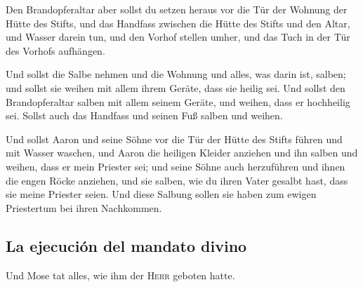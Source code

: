  Den Brandopferaltar aber sollst du setzen heraus vor die
Tür der Wohnung der Hütte des Stifts,  und das Handfass
zwischen die Hütte des Stifts und den Altar, und Wasser darein tun,
 und den Vorhof stellen umher, und das Tuch in der Tür des
Vorhofs aufhängen.

 Und sollst die Salbe nehmen und die Wohnung und alles,
was darin ist, salben; und sollst sie weihen mit allem ihrem Geräte,
dass sie heilig sei.  Und sollst den Brandopferaltar
salben mit allem seinem Geräte, und weihen, dass er hochheilig sei.
 Sollst auch das Handfass und seinen Fuß salben und
weihen.

 Und sollst Aaron und seine Söhne vor die Tür der Hütte
des Stifts führen und mit Wasser waschen,  und Aaron die
heiligen Kleider anziehen und ihn salben und weihen, dass er mein
Priester sei;  und seine Söhne auch herzuführen und ihnen
die engen Röcke anziehen,  und sie salben, wie du ihren
Vater gesalbt hast, dass sie meine Priester seien. Und diese Salbung
sollen sie haben zum ewigen Priestertum bei ihren Nachkommen.

\hypertarget{la-ejecuciuxf3n-del-mandato-divino}{%
\subsection{La ejecución del mandato
divino}\label{la-ejecuciuxf3n-del-mandato-divino}}

 Und Mose tat alles, wie ihm der \textsc{Herr} geboten
hatte.

